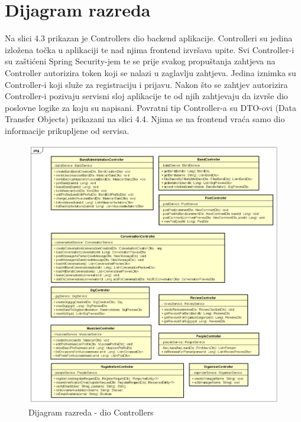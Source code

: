			
			
		\section{Dijagram razreda}


			
			
			
			Na slici 4.3 prikazan je Controllers dio backend aplikacije. Controlleri su jedina izložena točka u aplikaciji te nad njima frontend izvršava upite. Svi Controller-i su zaštićeni Spring Security-jem te se prije svakog propuštanja zahtjeva na Controller autorizira token koji se nalazi u zaglavlju zahtjeva. Jedina iznimka su Controller-i koji služe za registraciju i prijavu. Nakon što se zahtjev autorizira Controller-i pozivaju servisni sloj aplikacije te od njih zahtjevaju da izvrše dio poslovne logike za koju su napisani. Povratni tip Controller-a su DTO-ovi (Data Transfer Objects) prikazani na slici 4.4. Njima se na frontend vraća samo dio informacije prikupljene od servisa.  

			\begin{figure}[H]
				\begin{center}
					\includegraphics[width=17cm]{slike/kontroleri.PNG}
				\end{center}
				\caption{Dijagram razreda - dio Controllers}
				\label{fig:kontroleri}
			\end{figure}
		

